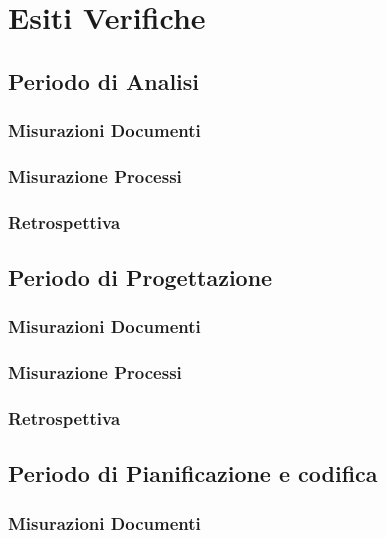 \documentclass[a4paper, oneside, openany, dvipsnames, table]{article}
\begin{document}
\appendix
{}

\newpage
\section{Esiti Verifiche}


	\label{app:misure}
	\subsection{Periodo di Analisi}
		\subsubsection{Misurazioni Documenti}
			
		\subsubsection{Misurazione Processi}
			
		\subsubsection{Retrospettiva}
			
		
\newpage	
	\subsection{Periodo di Progettazione}
		\subsubsection{Misurazioni Documenti}
			
		\subsubsection{Misurazione Processi}
			
		\subsubsection{Retrospettiva}
			

\newpage
	\subsection{Periodo di Pianificazione e codifica}
		\subsubsection{Misurazioni Documenti}
			
\end{document}
